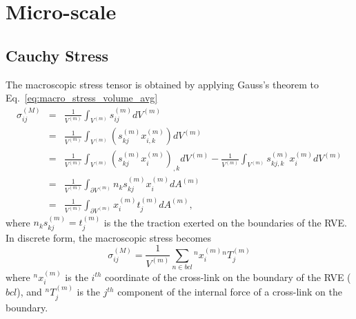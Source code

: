 \documentclass[12pt,aps,pre]{revtex4}
\begin{document}
\section{Micro-scale}
%
\subsection{Cauchy Stress}
%
The macroscopic stress tensor is obtained by applying Gauss's theorem to Eq.\ \eqref{eq:macro_stress_volume_avg}
%
\begin{eqnarray}
\sigma_{ij}^{(M)} &=& \frac{1}{V^{(m)}} \int_{V^{(m)}} s_{ij}^{(m)} dV^{(m)} \nonumber\\
%
&=& \frac{1}{V^{(m)}} \int_{V^{(m)}} (s_{kj}^{(m)} x_{i,k}^{(m)}) dV^{(m)} \nonumber\\
%
&=& \frac{1}{V^{(m)}} \int_{V^{(m)}} (s_{kj}^{(m)} x_i^{(m)})_{,k}dV^{(m)} - \frac{1}{V^{(m)}}\int_{V^{(m)}} s_{kj,k}^{(m)} x_i^{(m)} dV^{(m)} \nonumber\\
%
&=& \frac{1}{V^{(m)}} \int_{\partial V^{(m)}} n_k s_{kj}^{(m)} x_i^{(m)} dA^{(m)} \nonumber\\
%
&=& \frac{1}{V^{(m)}} \int_{\partial V^{(m)}} x_i^{(m)} t_j^{(m)} dA^{(m)},
\label{eq:macro_stress_gauss_thm}
\end{eqnarray}
%
where $n_k s_{kj}^{(m)} = t_j^{(m)}$ is the the traction exerted on the boundaries of the RVE. In discrete form, the macroscopic stress becomes
%
\begin{equation}
\sigma_{ij}^{(M)} = \frac{1}{V^{(m)}} \sum_{n \in bcl} {}^n x_i^{(m)} {}^n T_j^{(m)} 
\label{eq:macro_stress_discrete}
\end{equation}
%
where ${}^nx_i^{(m)}$ is the $i^{th}$ coordinate of the cross-link on the boundary of the RVE ($bcl$), and ${}^nT_j^{(m)}$ is the $j^{th}$ component of the internal force of a cross-link on the boundary. 
%
\end{document}
